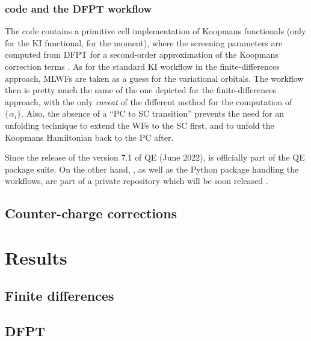 \subsubsection{\kcw code and the DFPT workflow}
The \kcw code contains a primitive cell implementation of Koopmans functionals (only for the KI functional, for the moment), where the screening parameters are computed from DFPT for a second-order approximation of the Koopmans correction terms \cite{colonna_koopmans_2022}. As for the standard KI workflow in the finite-differences approach, MLWFs are taken as a guess for the variational orbitals. The workflow then is pretty much the same of the one depicted for the finite-differences approach, with the only \emph{caveat} of the different method for the computation of $\{ \alpha_i \}$. Also, the absence of a ``PC to SC transition'' prevents the need for an unfolding technique to extend the WFs to the SC first, and to unfold the Koopmans Hamiltonian back to the PC after.

Since the release of the version 7.1 of QE (June 2022), \kcw is officially part of the QE package suite. On the other hand, \kcp, as well as the Python package handling the workflows, are part of a private repository which will be soon released \cite{linscott_koopmans_2022}.

\subsection{Counter-charge corrections\label{sec:counter-charge}}


\section{Results\label{sec:results-bands}}

\subsection{Finite differences\label{sec:results-dscf}}

\subsection{DFPT\label{sec:results-dfpt}}


